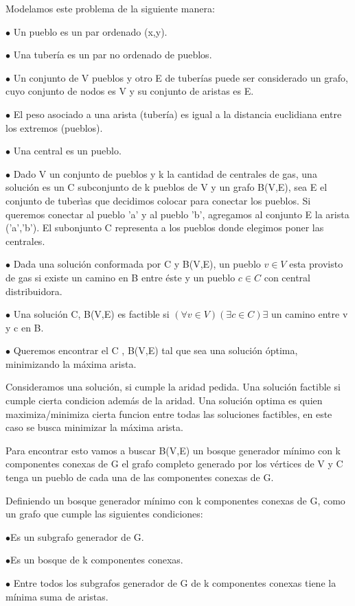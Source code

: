 Modelamos este problema de la siguiente manera:

$\bullet$ Un pueblo es un par ordenado (x,y).

$\bullet$ Una tubería es un par no ordenado de pueblos.

$\bullet$ Un conjunto de V pueblos y otro E de tuberías puede ser considerado un grafo, cuyo conjunto de nodos es V y su conjunto de aristas es E.

$\bullet$ El peso asociado a una arista (tubería) es igual a la distancia euclidiana entre los extremos (pueblos).

$\bullet$ Una central es un pueblo.

$\bullet$ Dado V un conjunto de pueblos y k la cantidad de centrales de gas, una solución es un C subconjunto de k pueblos de V y un grafo B(V,E), sea E el conjunto de tuberìas que decidimos colocar para conectar los pueblos. Si queremos conectar al pueblo 'a' y al pueblo 'b', agregamos al conjunto E la arista ('a','b'). El subonjunto C representa a los pueblos donde elegimos poner las centrales.  

$\bullet$ Dada una solución conformada por C y B(V,E), un pueblo $v \in V$ esta provisto de gas si existe un camino en B entre éste y un pueblo $c \in C$ con central distribuidora.

$\bullet$ Una solución C, B(V,E) es factible si $(\forall v \in V)(\exists c \in C) \exists$ un camino entre v y c en B. 

$\bullet$ Queremos encontrar el C , B(V,E) tal que sea una solución óptima, minimizando la máxima arista.

Consideramos una solución, si cumple la aridad pedida. Una solución factible si cumple cierta condicion además de la aridad. Una solución optima es quien maximiza/minimiza cierta funcion entre todas las soluciones factibles, en este caso se busca minimizar la máxima arista.

Para encontrar esto vamos a buscar B(V,E) un bosque generador mínimo con k componentes conexas de G el grafo completo generado por los vértices de V y C tenga un pueblo de cada una de las componentes conexas de G.

Definiendo un bosque generador mínimo con k componentes conexas de G, como un grafo que cumple las siguientes condiciones:

$\bullet$Es un subgrafo generador de G. 

$\bullet$Es un bosque de k componentes conexas.

$\bullet$ Entre todos los subgrafos generador de G de k componentes conexas tiene la mínima suma de aristas.

